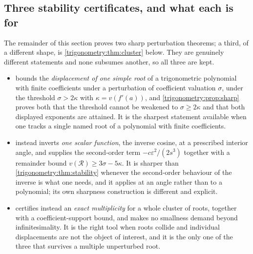 \documentclass[11pt,letterpaper]{article}
\numberwithin{equation}{section}
\theoremstyle{definition}
\theoremstyle{remark}
\newcommand{\eps}{\varepsilon}
\begin{document}
\subsection{Three stability certificates, and what each is for}
\label{trigonometry:sec:threecertificates}
The remainder of this section proves two sharp perturbation theorems; a third, of a different
shape, is \cref{trigonometry:thm:cluster} below. They are genuinely different statements and none
subsumes another, so all three are kept.
\begin{itemize}
\item {} bounds the \emph{displacement of one simple root} of a
 trigonometric polynomial with finite coefficients under a perturbation of coefficient valuation
 $\sigma$, under the threshold $\sigma>2\kappa$ with $\kappa=v(f'(a))$, and
 \cref{trigonometry:prop:sharp} proves both that the threshold cannot be weakened to $\sigma\ge
 2\kappa$ and that both displayed exponents are attained. It is the sharpest statement available
 when one tracks a single named root of a polynomial with finite coefficients.
\item {} instead inverts \emph{one scalar function}, the inverse
 cosine, at a prescribed interior angle, and supplies the second-order term $-c\eps^2/(2s^3)$
 together with a remainder bound $v(\mathcal R)\ge3\sigma-5\kappa$. It is sharper than
 \cref{trigonometry:thm:stability} whenever the second-order behaviour of the inverse is what one
 needs, and it applies at an angle rather than to a polynomial; its own sharpness construction is
 different and explicit.
\item {} certifies instead an \emph{exact multiplicity} for a whole
 cluster of roots, together with a coefficient-support bound, and makes no smallness demand beyond
 infinitesimality. It is the right tool when roots collide and individual displacements are not
 the object of interest, and it is the only one of the three that survives a multiple unperturbed
 root.
\end{itemize}
\end{document}
